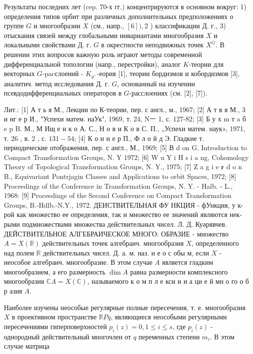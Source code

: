 \documentclass[10pt]{article}
\begin{document}
Результаты последних лет (cep. 70-х гг.) концентрируются в основном вокруг: 1) определения типов орбит при различных дополнительных предположениях о группе $G$ и многообразии $X$ (см., напр., $[6]), 2$ ) классификации Д. г., 3) отыскания связей между глобальными инвариантами многообразия $X$ и локальными свойствами Д. г. $G$ в окрестности неподвижных точек $X^{G}$. В решении этих вопросов важную роль играют методы современной дифференциальной топологии (напр., перестройки), аналог $K$-теории для векторных $G$-pacслоений - $K_{g^{-}}$-еория [1], теории бордизмов и кобордизмов [3], аналитич. метод исследования Д. г. $G$, основанный на изучении псевдодифференциальных операторов в $G$-расслоениях (см. [2], [7]).



Лит.: [1] А т ь я М., Лекции по К-теории, пер. с англ., м., 1967; [2] А т в я М., 3 и нг е р И., "Успехи матем. наУк", 1969, т. 24, Nㅡ 1, с. 127-82; [3] Б у х m т a б e p B. М., М Ищ е н к о А. С., Н о в и К о в С. П., „Успехи матем. наук», 1971, т. 26 , в. 2 , с. $131-54$; [4] К о н н е р П., Ф л о й д Э. Гладкие т. периодические отображения, пер. с англ., М., 1969; [5] В d on G. Introduction to Compact Transformation Groups, N. Y 1972; [6] W u Y i H s i a ng, Cohomology Theory of Topological Transformation Groups, N. Y., 1975; [7] Z a g i e $\mathbf{r}$ d o n B., Equivariant Pontrjagin Classes and Applications to orbit Spaces, 1972; [8] Proceedings of the Conference in Transformation Groups, N. Y. - Halb. - L., 1968: [9] Proceedings of the Second Conference on Compact Transformation Groups, B.-Hdlb.-N.Y., 1972. ДЕИСТВИТЕЛЬНАЯ ФУ НКЦИЯ - фУнкция, у к-рой как множество ее определения, так и множество ее значений являются нек-рыми подмножествами множества действительных чисел. Л. Д. Куәрявчев. ДЕЙСТВИТЕЛЬНОЕ АЛГЕБРАИЧЕСКОЕ МНОГО: ОБРАЗИЕ - множество $A=X(\mathbb{R})$ действительных точек алгебраич. многообразия $X$, определенного над полем $\mathbb{R}$ действительных чисел. Д. а. м. наз. н е о с обы м, если $X$ - неособое алгебраич. многообразие. В этом случае $A$ является гладким многообразием, а его размерность $\operatorname{dim} A$ равна размерности комплексного многообразия $\mathbb{C} A=X(\mathbb{C})$, называемого к о м п л е кси и и а ци е й мн о го о б р азия $A$.



Наиболее изучены неособые регулярные полные пересечения, т. е. многообразия $X$ в проективном пространстве $\mathbb{R} P q$, являющиеся неособыми регулярными пересечениями гиперповерхностей $p_{i}(z)=0,1 \leqslant i \leqslant s$, где $p_{i}(z)$ - однородный действительный многочлен от $q$ переменных степени $m_{i}$. В этом случае матрица
\end{document}
